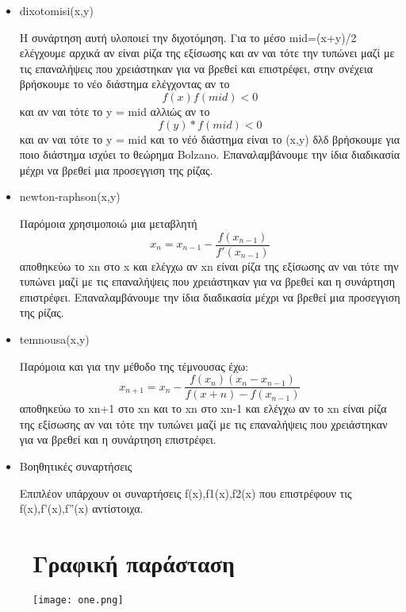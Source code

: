 \documentclass{article}
\begin{document}
    \begin{itemize}
    \item {dixotomisi(x,y)}
    
    Η συνάρτηση αυτή υλοποιεί την διχοτόμηση.
    Για το μέσο mid=(x+y)/2 ελέγχουμε αρχικά αν είναι ρίζα της εξίσωσης και αν ναι τότε την τυπώνει μαζί με τις επαναλήψεις που χρειάστηκαν για να βρεθεί και επιστρέφει, 
    στην σνέχεια βρήσκουμε το νέο διάστημα ελέγχοντας αν το 
    \begin{equation}
       f(x)f(mid)<0
    \end{equation}
    και αν ναι τότε το y = mid 
    αλλιώς αν το 
    \begin{equation}
       f(y)*f(mid) <0
    \end{equation} και αν ναι τότε το y = mid και το νέό διάστημα είναι το (x,y) δλδ βρήσκουμε για ποιο διάστημα ισχύει το θεώρημα Bolzano.
    Επαναλαμβάνουμε την ίδια διαδικασία μέχρι να βρεθεί μια προσεγγιση της ρίζας.
    
    \item newton-raphson(x,y)
    
    Παρόμοια χρησιμοποιώ μια μεταβλητή 
    \begin{equation}
       x_n = x_{n-1} - \frac{f(x_{n-1})}{f'(x_{n-1})}
    \end{equation}
    αποθηκεύω το xn στο x και ελέγχω αν xn είναι ρίζα της εξίσωσης αν ναι τότε την τυπώνει μαζί με τις επαναλήψεις που χρειάστηκαν για να βρεθεί και η συνάρτηση επιστρέφει.
    Επαναλαμβάνουμε την ίδια διαδικασία μέχρι να βρεθεί μια προσεγγιση της ρίζας.
    
    \item temnousa(x,y)
    
    Παρόμοια και για την μέθοδο της τέμνουσας έχω: 
    \begin{equation}
        x_{n+1} = x_n - \frac{f(x_n)(x_n - x_{n-1})}{f(x+n) - f(x_{n-1})}
    \end{equation}
    αποθηκεύω το xn+1 στο xn και το xn στο xn-1 και ελέγχω αν το xn είναι ρίζα της εξίσωσης αν ναι τότε την τυπώνει μαζί με τις επαναλήψεις που χρειάστηκαν για να βρεθεί και η συνάρτηση επιστρέφει.
    
    \item{Βοηθητικές συναρτήσεις}
    
    Επιπλέον υπάρχουν οι συναρτήσεις 
    f(x),f1(x),f2(x) 
    που επιστρέφουν τις 
    f(x),f'(x),f''(x) αντίστοιχα.
\end{itemize}


\begin{figure}[h]
\section{Γραφική παράσταση}
\texttt{[image: one.png]}
\end{figure}
\end{document}
